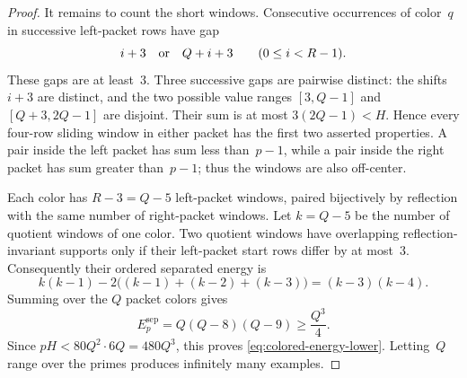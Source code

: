 \begin{proof}
It remains to count the short windows.  Consecutive occurrences of
color~$q$ in successive left-packet rows have gap
\[
 i+3\quad\hbox{or}\quad Q+i+3
 \qquad(0\le i<R-1).
\]
These gaps are at least~$3$.  Three successive gaps are pairwise distinct:
the shifts $i+3$ are distinct, and the two possible value ranges
$[3,Q-1]$ and $[Q+3,2Q-1]$ are disjoint.  Their sum is at most
$3(2Q-1)<H$.  Hence every four-row sliding window in either packet has
the first two asserted properties.  A pair inside the left packet has
sum less than~$p-1$, while a pair inside the right packet has sum greater
than~$p-1$; thus the windows are also off-center.

Each color has $R-3=Q-5$ left-packet windows, paired bijectively by
reflection with the same number of right-packet windows.  Let
$k=Q-5$ be the number of quotient windows of one color.  Two quotient
windows have overlapping reflection-invariant supports only if their
left-packet start rows differ by at most~$3$.  Consequently their ordered
separated energy is
\[
 k(k-1)-2\bigl((k-1)+(k-2)+(k-3)\bigr)
 =(k-3)(k-4).
\]
Summing over the $Q$ packet colors gives
\[
 E_p^{\mathrm{sep}}
 =Q(Q-8)(Q-9)\ge\frac{Q^3}{4}.
\]
Since $pH<80Q^2\cdot6Q=480Q^3$, this proves
\eqref{eq:colored-energy-lower}.  Letting~$Q$ range over the primes
produces infinitely many examples.
\end{proof}

